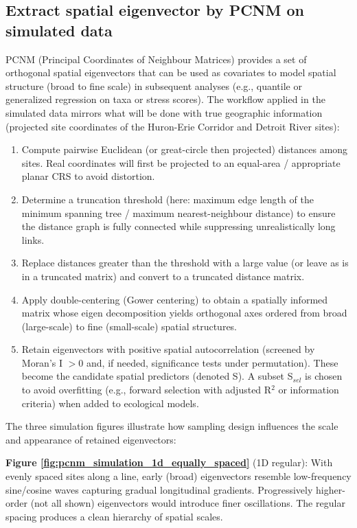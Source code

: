 \clearpage
\subsection{Extract spatial eigenvector by PCNM on simulated data}

PCNM (Principal Coordinates of Neighbour Matrices) provides a set of orthogonal spatial eigenvectors that can be used as 
covariates to model spatial structure (broad to fine scale) in subsequent analyses (e.g., quantile or generalized regression 
on taxa or stress scores). 
The workflow applied in the simulated data mirrors what will be done with true geographic information
(projected site coordinates of the Huron-Erie Corridor and Detroit River sites):

\begin{enumerate}
    \item Compute pairwise Euclidean (or great-circle then projected) distances among sites. Real coordinates will first be projected to an equal-area / appropriate planar CRS to avoid distortion.
    \item Determine a truncation threshold (here: maximum edge length of the minimum spanning tree / maximum nearest-neighbour distance) to ensure the distance graph is fully connected while suppressing unrealistically long links.
    \item Replace distances greater than the threshold with a large value (or leave as is in a truncated matrix) and convert to a truncated distance matrix.
    \item Apply double-centering (Gower centering) to obtain a spatially informed matrix whose eigen decomposition yields orthogonal axes ordered from broad (large-scale) to fine (small-scale) spatial structures.
    \item Retain eigenvectors with positive spatial autocorrelation (screened by Moran's I \(> 0\) and, if needed, significance tests under permutation).
    These become the candidate spatial predictors (denoted S). A subset S$_{sel}$ is chosen to avoid overfitting (e.g., forward selection with adjusted R$^2$ or information criteria) when added to ecological models.
\end{enumerate}

The three simulation figures illustrate how sampling design influences the scale and appearance of retained eigenvectors:

\textbf{Figure \textcolor{blue}{\ref{fig:pcnm_simulation_1d_equally_spaced}}} (1D regular): With evenly spaced sites along a line, early (broad) eigenvectors resemble low-frequency sine/cosine waves capturing gradual longitudinal gradients. Progressively higher-order (not all shown) eigenvectors would introduce finer oscillations.
 The regular spacing produces a clean hierarchy of spatial scales.

